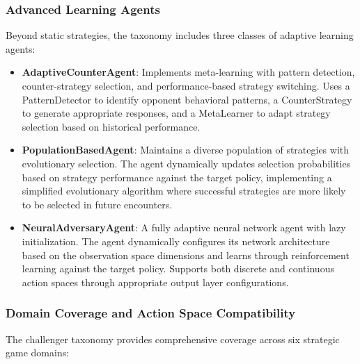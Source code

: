 \documentclass[sigconf,anonymous]{aamas}
\begin{document}
\subsubsection{Advanced Learning Agents}

Beyond static strategies, the taxonomy includes three classes of adaptive learning agents:

\begin{itemize}
    \item \textbf{AdaptiveCounterAgent}: Implements meta-learning with pattern detection, counter-strategy selection, and performance-based strategy switching. Uses a PatternDetector to identify opponent behavioral patterns, a CounterStrategy to generate appropriate responses, and a MetaLearner to adapt strategy selection based on historical performance.
    
    \item \textbf{PopulationBasedAgent}: Maintains a diverse population of strategies with evolutionary selection. The agent dynamically updates selection probabilities based on strategy performance against the target policy, implementing a simplified evolutionary algorithm where successful strategies are more likely to be selected in future encounters.
    
    \item \textbf{NeuralAdversaryAgent}: A fully adaptive neural network agent with lazy initialization. The agent dynamically configures its network architecture based on the observation space dimensions and learns through reinforcement learning against the target policy. Supports both discrete and continuous action spaces through appropriate output layer configurations.
\end{itemize}

\subsubsection{Domain Coverage and Action Space Compatibility}

The challenger taxonomy provides comprehensive coverage across six strategic game domains:
\end{document}
